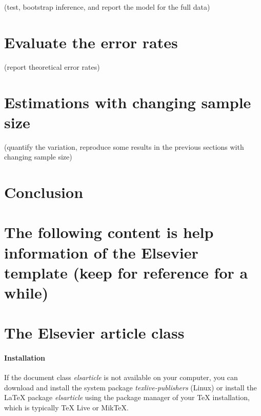 \documentclass[]{elsarticle} %
\begin{document}
(test, bootstrap inference, and report the model for the full data)

\hypertarget{evaluate-the-error-rates}{%
\section{Evaluate the error rates}\label{evaluate-the-error-rates}}

(report theoretical error rates)

\hypertarget{estimations-with-changing-sample-size}{%
\section{Estimations with changing sample
size}\label{estimations-with-changing-sample-size}}

(quantify the variation, reproduce some results in the previous sections
with changing sample size)

\hypertarget{conclusion}{%
\section{Conclusion}\label{conclusion}}

\hypertarget{the-following-content-is-help-information-of-the-elsevier-template-keep-for-reference-for-a-while}{%
\section{The following content is help information of the Elsevier
template (keep for reference for a
while)}\label{the-following-content-is-help-information-of-the-elsevier-template-keep-for-reference-for-a-while}}

\hypertarget{the-elsevier-article-class}{%
\section{The Elsevier article class}\label{the-elsevier-article-class}}

\hypertarget{installation}{%
\paragraph{Installation}\label{installation}}

If the document class \emph{elsarticle} is not available on your
computer, you can download and install the system package
\emph{texlive-publishers} (Linux) or install the LaTeX package
\emph{elsarticle} using the package manager of your TeX installation,
which is typically TeX Live or MikTeX.
\end{document}
